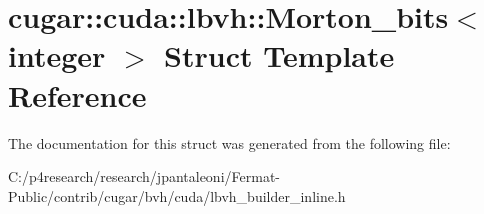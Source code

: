 \hypertarget{structcugar_1_1cuda_1_1lbvh_1_1_morton__bits}{}\section{cugar\+:\+:cuda\+:\+:lbvh\+:\+:Morton\+\_\+bits$<$ integer $>$ Struct Template Reference}
\label{structcugar_1_1cuda_1_1lbvh_1_1_morton__bits}


The documentation for this struct was generated from the following file\+:\begin{DoxyCompactItemize}
\item 
C\+:/p4research/research/jpantaleoni/\+Fermat-\/\+Public/contrib/cugar/bvh/cuda/lbvh\+\_\+builder\+\_\+inline.\+h\end{DoxyCompactItemize}
